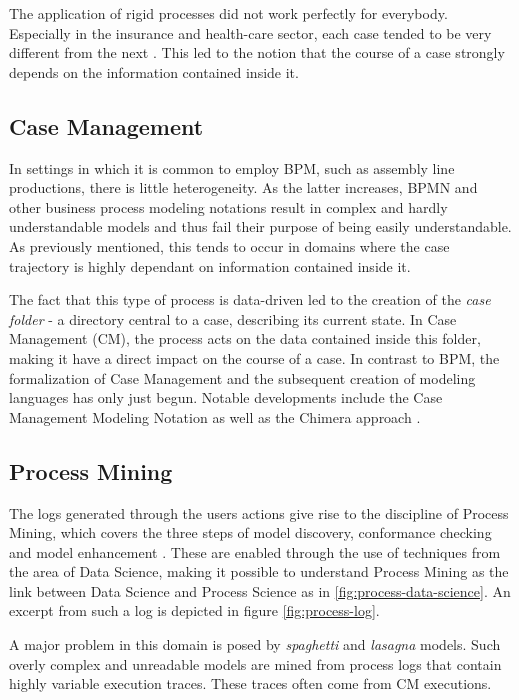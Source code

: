 The application of rigid processes did not work perfectly for everybody. Especially in the insurance and health-care sector, each case tended to be very different from the next \cite{hewelt2016}. This led to the notion that the course of a case strongly depends on the information contained inside it.

\subsection{Case Management}
In settings in which it is common to employ BPM, such as assembly line productions, there is little heterogeneity. As the latter increases, BPMN and other business process modeling notations result in complex and hardly understandable models and thus fail their purpose of being easily understandable. As previously mentioned, this tends to occur in domains where the case trajectory is highly dependant on information contained inside it.

The fact that this type of process is data-driven led to the creation of the \textit{case folder} - a directory central to a case, describing its current state. In Case Management (CM), the process acts on the data contained inside this folder, making it have a direct impact on the course of a case. In contrast to BPM, the formalization of Case Management and the subsequent creation of modeling languages has only just begun. Notable developments include the Case Management Modeling Notation \cite{web:cmmn} as well as the Chimera approach \cite{hewelt2016}.

\subsection{Process Mining}
The logs generated through the users actions give rise to the discipline of Process Mining, which covers the three steps of model discovery, conformance checking and model enhancement \cite{Aalst2016}. These are enabled through the use of techniques from the area of Data Science, making it possible to understand Process Mining as the link between Data Science and Process Science as in \autoref{fig:process-data-science}. An excerpt from such a log is depicted in figure \ref{fig:process-log}.

A major problem in this domain is posed by \textit{spaghetti} and \textit{lasagna} models. Such overly complex and unreadable models are mined from process logs that contain highly variable execution traces. These traces often come from CM executions.

